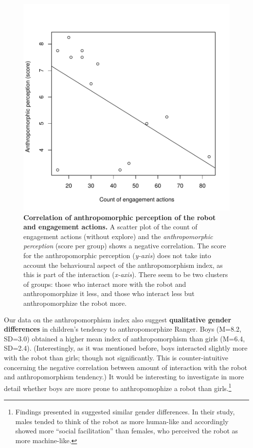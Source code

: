 \documentclass{sig-alternate}
\begin{document}
\begin{figure}[t]
    \centering
    \includegraphics[width=0.8\columnwidth]{domino-correlation.pdf}   

    \caption[Correlation of Anthropomorphic Perception of the Robot and
    Interaction]{\small \textbf{Correlation of anthropomorphic perception of the
    robot and engagement actions.} A scatter plot of the count of engagement
    actions (without explore) and the \textit{anthropomorphic perception} (score per
    group) shows a negative correlation. The score for the anthropomorphic
    perception (\textit{y-axis}) does not take into account the behavioural aspect of
    the anthropomorphism index, as this is part of the interaction
    (\textit{x-axis}).  There seem to be two clusters of groups: those who interact
    more with the robot and anthropomorphize it less, and those who interact less
    but anthropomorphize the robot more.}

    \label{fig:domino-anthropo-interaction}
\end{figure}	

Our data on the anthropomorphism index also suggest \textbf{qualitative gender
differences} in children's tendency to anthropomorphize Ranger. Boys (M=8.2,
SD=3.0) obtained a higher mean index of anthropomorphism than girls (M=6.4,
SD=2.4). (Interestingly, as it was mentioned before, boys interacted slightly
more with the robot than girls; though not significantly. This is
counter-intuitive concerning the negative correlation between amount of
interaction with the robot and anthropomorphism tendency.) It would be
interesting to investigate in more detail whether boys are more prone to
anthropomophize a robot than girls.\footnote{Findings presented in
\cite{schermerhorn_robot_2008} suggested similar gender differences. In their
study, males tended to think of the robot as more human-like and accordingly
showed more ``social facilitation'' than females, who perceived the robot as
more machine-like.} 
\end{document}
